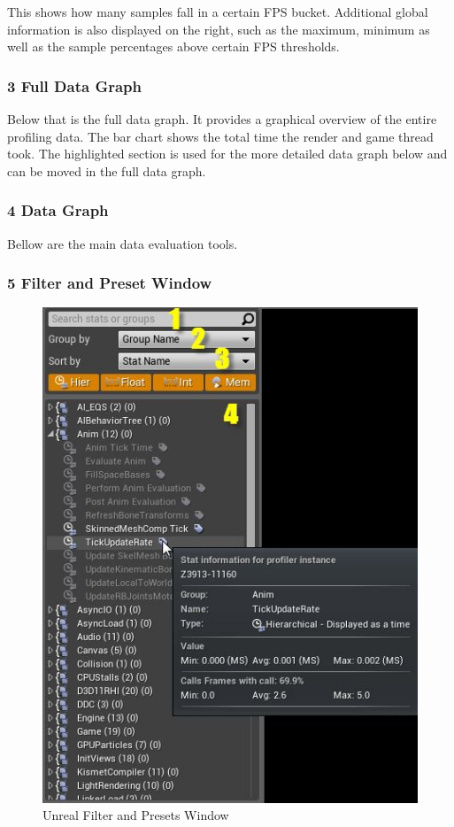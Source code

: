 This shows how many samples fall in a certain FPS bucket. Additional global information is also displayed on the right, such as the maximum, minimum as well as the sample percentages above certain FPS thresholds.

\subsubsection{3 Full Data Graph}
Below that is the full data graph. It provides a graphical overview of the entire profiling data. The bar chart shows the total time the render and game thread took. The highlighted section is used for the more detailed data graph below and can be moved in the full data graph.
\citep{unreal_profiler}

\subsubsection{4 Data Graph}
Bellow are the main data evaluation tools.

\subsubsection{5 Filter and Preset Window}

\begin{figure}[htbp]
\includegraphics[scale = 0.39]{img/Unreal_FilterPresets.jpg}
\caption{Unreal Filter and Presets Window}
\label{fig:UnrealFilterPresets}
\end{figure}

